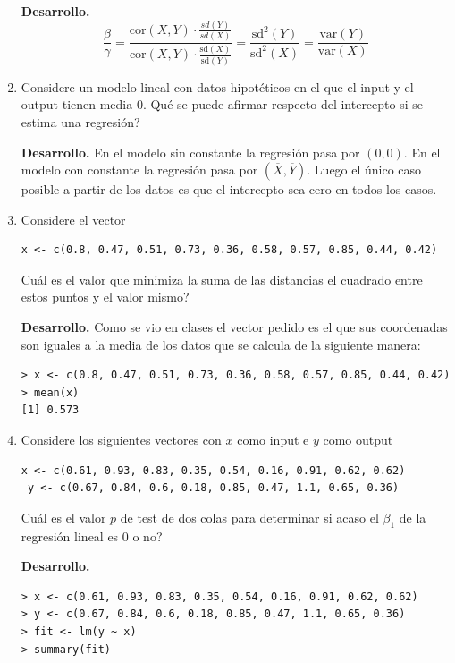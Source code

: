 \documentclass[11pt,oneside,spanish]{article}
\theoremstyle{definition}
\theoremstyle{definition}\newtheorem{definicion}{Definicin}
\theoremstyle{definition}\newtheorem{ejemplo}{Ejemplo}
\theoremstyle{remark}\newtheorem{nota}{\textsc{Nota}}
\theoremstyle{definition}\newtheorem{proposicion}{Proposicin}
\theoremstyle{definition}\newtheorem{problema}{Problema}
\begin{document}
\begin{enumerate}[(1)]
\textbf{Desarrollo.}
$$\displaystyle \frac{\beta}{\gamma} = \displaystyle\frac{\text{cor}(X,Y)\cdot \displaystyle \frac{sd(Y)}{sd(X)}}{\text{cor}(X,Y)\cdot \displaystyle \frac{\text{sd}(X)}{\text{sd}(Y)}} = \displaystyle \frac{\text{sd}^2(Y)}{\text{sd}^2(X)} = \displaystyle \frac{\text{var}(Y)}{\text{var}(X)}$$

\item Considere un modelo  lineal con datos hipot\'eticos en el que el input y el output tienen media 0. {\textquestiondown}Qu\'e se puede afirmar respecto del intercepto si se estima una regresi\'on?		

\textbf{Desarrollo.}
En el modelo sin constante la regresi\'on pasa por $(0,0)$. En el modelo con constante la regresi\'on pasa por $(\overline{X},\overline{Y})$. Luego el \'unico caso posible a partir de los datos es que el intercepto sea cero en todos los casos.

\item Considere el vector
\begin{lstlisting}[backgroundcolor=\color{Gray!20},frame=none,basicstyle=\ttfamily]
 x <- c(0.8, 0.47, 0.51, 0.73, 0.36, 0.58, 0.57, 0.85, 0.44, 0.42)
\end{lstlisting}
{\textquestiondown}Cu\'al es el valor que minimiza la suma de las distancias el cuadrado entre estos puntos y el valor mismo?

\textbf{Desarrollo.}
Como se vio en clases el vector pedido es el que sus coordenadas son iguales a la media de los datos que se calcula de la siguiente manera:
\begin{lstlisting}[backgroundcolor=\color{Gray!20},frame=none,basicstyle=\ttfamily]
> x <- c(0.8, 0.47, 0.51, 0.73, 0.36, 0.58, 0.57, 0.85, 0.44, 0.42)
> mean(x)
[1] 0.573
\end{lstlisting}

\item Considere los siguientes vectores con $x$ como input e $y$ como output
\begin{lstlisting}[backgroundcolor=\color{Gray!20},frame=none,basicstyle=\ttfamily]
 x <- c(0.61, 0.93, 0.83, 0.35, 0.54, 0.16, 0.91, 0.62, 0.62)
 y <- c(0.67, 0.84, 0.6, 0.18, 0.85, 0.47, 1.1, 0.65, 0.36)
\end{lstlisting}
{\textquestiondown}Cu\'al es el valor $p$ de test de dos colas para determinar si acaso el $\beta_1$ de la regresi\'on lineal es 0 o no?

\textbf{Desarrollo.}
\begin{lstlisting}[backgroundcolor=\color{Gray!20},frame=none,basicstyle=\ttfamily]
> x <- c(0.61, 0.93, 0.83, 0.35, 0.54, 0.16, 0.91, 0.62, 0.62)
> y <- c(0.67, 0.84, 0.6, 0.18, 0.85, 0.47, 1.1, 0.65, 0.36)
> fit <- lm(y ~ x)
> summary(fit)


\end{lstlisting}
\end{enumerate}
\end{document}
